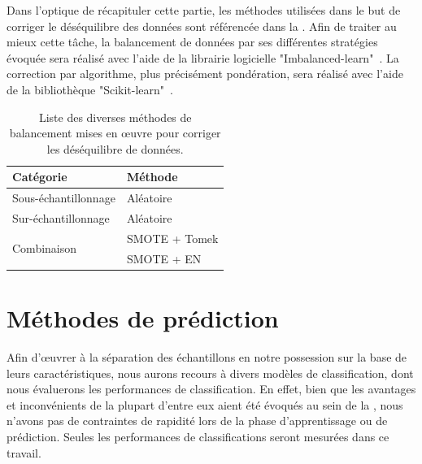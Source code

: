 Dans l'optique de récapituler cette partie, les méthodes utilisées dans le but de corriger le déséquilibre des données sont référencée dans la . Afin de traiter au mieux cette tâche, la balancement de données par ses différentes stratégies évoquée sera réalisé avec l'aide de la librairie logicielle "Imbalanced-learn"~\cite{Lemaitre2017}. La correction par algorithme, plus précisément pondération, sera réalisé avec l'aide de la bibliothèque "Scikit-learn"~\cite{pedregosa2011}.\par

\begin{table}[H]
    \centering
    \begin{tabular*}{0.6\linewidth}{l@{\extracolsep{\fill}}l}
        \toprule
        \textbf{Catégorie}                  & \textbf{Méthode}      \\ \hline
        Sous-échantillonnage                 & Aléatoire             \\ \hline
        Sur-échantillonnage                  & Aléatoire             \\ \hline
        \multirow{2}{*}{Combinaison}        & SMOTE + Tomek         \\ \cline{2-2}
                                            & SMOTE + EN            \\
        \bottomrule
    \end{tabular*}
    \caption{Liste des diverses méthodes de balancement mises en œuvre pour corriger les déséquilibre de données.}
    \label{tab:summary_balancement_methods}
\end{table}\par

\section{Méthodes de prédiction}
Afin d'œuvrer à la séparation des échantillons en notre possession sur la base de leurs caractéristiques, nous aurons recours à divers modèles de classification, dont nous évaluerons les performances de classification. En effet, bien que les avantages et inconvénients de la plupart d'entre eux aient été évoqués au sein de la , nous n'avons pas de contraintes de rapidité lors de la phase d'apprentissage ou de prédiction. Seules les performances de classifications seront mesurées dans ce travail.\par

